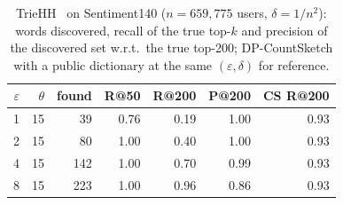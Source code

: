 \begin{table}[t]\centering\footnotesize
\caption{TrieHH~\cite{zhu2020} on Sentiment140 ($n{=}659{,}775$ users, $\delta{=}1/n^2$): words discovered, recall of the true top-$k$ and precision of the discovered set w.r.t.\ the true top-200; DP-CountSketch with a public dictionary at the same $(\varepsilon,\delta)$ for reference.}\label{tab:triehh}
\setlength{\tabcolsep}{3pt}\begin{tabular}{rrrrrrr}\toprule
$\varepsilon$ & $\theta$ & found & R@50 & R@200 & P@200 & CS R@200\\\midrule
1 & 15 & 39 & 0.76 & 0.19 & 1.00 & 0.93\\
2 & 15 & 80 & 1.00 & 0.40 & 1.00 & 0.93\\
4 & 15 & 142 & 1.00 & 0.70 & 0.99 & 0.93\\
8 & 15 & 223 & 1.00 & 0.96 & 0.86 & 0.93\\
\bottomrule\end{tabular}\end{table}